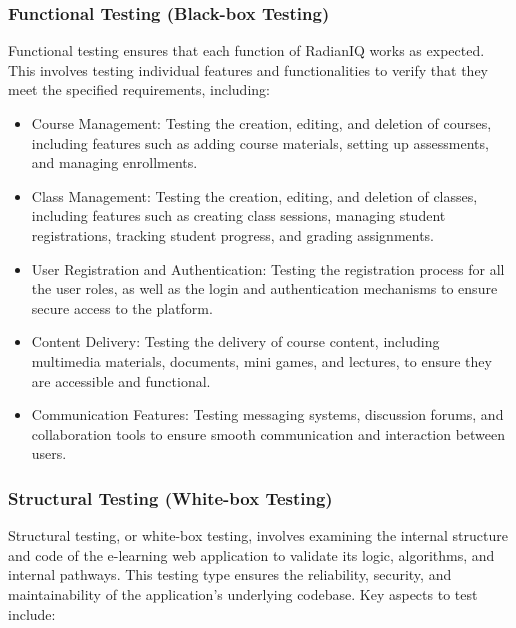 		\subsubsection{Functional Testing (Black-box Testing)}
		
		Functional testing ensures that each function of RadianIQ works as expected. This involves testing individual features and functionalities to verify that they meet the specified requirements, including:
		
		\begin{itemize}
			\item Course Management: Testing the creation, editing, and deletion of courses, including features such as adding course materials, setting up assessments, and managing enrollments.
			\item Class Management: Testing the creation, editing, and deletion of classes, including features such as creating class sessions, managing student registrations, tracking student progress, and grading assignments.
			\item User Registration and Authentication: Testing the registration process for all the user roles, as well as the login and authentication mechanisms to ensure secure access to the platform.
			\item Content Delivery: Testing the delivery of course content, including multimedia materials, documents, mini games, and lectures, to ensure they are accessible and functional.
			\item Communication Features: Testing messaging systems, discussion forums, and collaboration tools to ensure smooth communication and interaction between users.
		\end{itemize}

		\subsubsection{Structural Testing (White-box Testing)}

		Structural testing, or white-box testing, involves examining the internal structure and code of the e-learning web application to validate its logic, algorithms, and internal pathways. This testing type ensures the reliability, security, and maintainability of the application's underlying codebase. Key aspects to test include:

